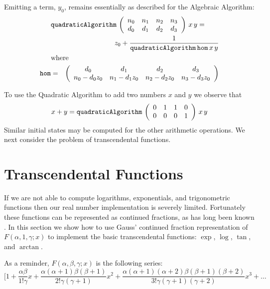 Emitting a term, $y_0$, remains essentially as described for the Algebraic
Algorithm:
\begin{eqnarray*}
\lefteqn{\mbox{\tt quadraticAlgorithm}\indexTT{quadraticAlgorithm}\,
\left(\begin{array}{cccc}n_0&n_1&n_2&n_3\\d_0&d_1&d_2&d_3\end{array}\right)
\,x\,y =}\\
&&z_0 + \frac{1}{\mbox{\tt quadraticAlgorithm}\indexTT{quadraticAlgorithm}\,\mbox{\tt hom}\indexTT{hom}\,x\,y}\\
\lefteqn{\mbox{where}}\\
\mbox{\tt hom}\indexTT{hom} & = &
 \left(\begin{array}{cccc}d_0&d_1&d_2&d_3\\n_0-d_0z_0&n_1-d_1z_0&n_2-d_2z_0&n_3
-d_3z_0
             \end{array}\right)
\end{eqnarray*}

To use the Quadratic Algorithm to add two numbers $x$ and $y$ we
observe that
\[x+y = \mbox{\tt quadraticAlgorithm}\indexTT{quadraticAlgorithm}\,
\left(\begin{array}{cccc}0&1&1&0\\0&0&0&1\end{array}\right)
\,x\,y\]
Similar initial states may be computed for the other arithmetic
operations. We next consider the problem of transcendental functions.
 
\section{Transcendental Functions}
\label{sc:tf}

If we are not able to compute logarithms, exponentials, and
trigonometric functions then our real number implementation is
severely limited.  Fortunately these functions can be represented as
continued fractions, as has long been known
\cite{GAUSS1812a,GAUSS1876a}. In this section we show how to use
Gauss' continued fraction representation of $F(\alpha , 1, \gamma ;
x)$ to implement the basic transcendental functions: $\exp$, $\log$,
$\tan$, and $\arctan$.

As a reminder, $F(\alpha , \beta , \gamma ; x)$ is the following series:
\[
[1 + \frac{\alpha \beta}{1! \gamma}x +
\frac{\alpha(\alpha +1) \beta (\beta +1)}{2! \gamma(\gamma +1)}x^2 +
\frac{\alpha(\alpha +1)(\alpha +2) \beta (\beta +1)(\beta +2)}%
{3! \gamma(\gamma +1)(\gamma +2)}x^3 +
\ldots \]

